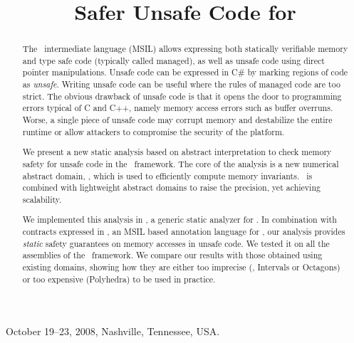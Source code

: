 \documentclass[10pt]{sigplanconf}
\begin{document}
 {October 19--23, 2008, Nashville, Tennessee, USA.}


\title{Safer Unsafe Code for \net} 




\pagestyle{plain}

\maketitle

\begin{abstract}
The \net\ intermediate language (MSIL) allows expressing both
statically verifiable memory and type safe code (typically called
managed), as well as unsafe code using direct pointer
manipulations. Unsafe code can be expressed in C\# by marking 
regions of code as \emph{unsafe}.  Writing unsafe code can be useful
where the rules of managed code are too strict. The obvious drawback
of unsafe code is that it opens the door to programming errors typical
of C and C++, namely memory access errors such as buffer
overruns. Worse, a single piece of unsafe code may corrupt memory and
destabilize the entire runtime or allow attackers to compromise the
security of the platform.

We present a new static analysis based on abstract interpretation to
check memory safety for unsafe code in the \net\ framework.  The core
of the analysis is a new numerical abstract domain, \Stripes, which is
used to efficiently compute memory invariants.  \Stripes\ is combined with
lightweight abstract domains to raise the precision, yet achieving
scalability.

We implemented this analysis in \Clousot, a generic static analyzer for
\NET.  In combination with contracts expressed in \Foxtrot, an MSIL
based annotation language for \NET, our analysis provides
\emph{static} safety guarantees on memory accesses in unsafe code.  
We tested it on all the assemblies of the \NET\ framework.
We compare our results with those obtained using existing domains, showing how they are either too imprecise (\eg, Intervals or Octagons) or too expensive (Polyhedra) to be used in  practice.
\end{abstract}
\end{document}
